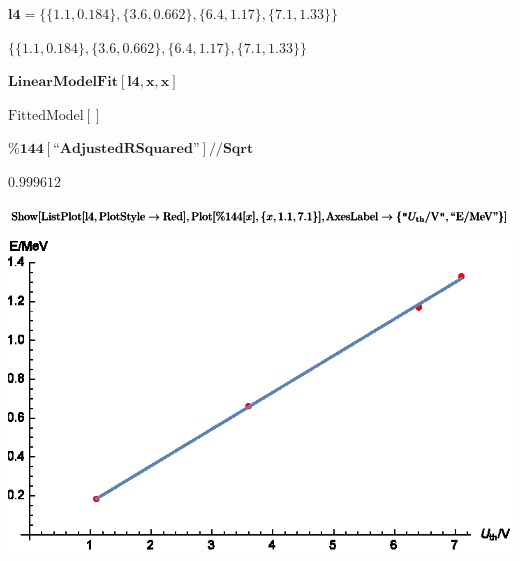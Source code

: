 \documentclass{article}
\begin{document}
\begin{doublespace}
\noindent\(\pmb{\text{l4}=\{\{1.1,0.184\},\{3.6,0.662\},\{6.4,1.17\},\{7.1,1.33\}\}}\)
\end{doublespace}

\begin{doublespace}
\noindent\(\{\{1.1,0.184\},\{3.6,0.662\},\{6.4,1.17\},\{7.1,1.33\}\}\)
\end{doublespace}

\begin{doublespace}
\noindent\(\pmb{\text{LinearModelFit}[\text{l4},x,x]}\)
\end{doublespace}

\begin{doublespace}
\noindent\(\text{FittedModel}[]\)
\end{doublespace}

\begin{doublespace}
\noindent\(\pmb{\text{$\%$144}[\text{{``}AdjustedRSquared{''}}]\text{//}\text{Sqrt}}\)
\end{doublespace}

\begin{doublespace}
\noindent\(0.999612\)
\end{doublespace}

\begin{doublespace}
\noindent\(\pmb{\text{Show}[\text{ListPlot}[\text{l4},\text{PlotStyle}\to \text{Red}],\text{Plot}[\text{$\%$144}[x],\{x,1.1,7.1\}],}\\
\pmb{\left.\text{AxesLabel}\to \left\{\texttt{"}U_{\text{th}}\text{/V$\texttt{"}$},\text{{``}E/MeV{''}}\right\}\right]}\)
\end{doublespace}

\includegraphics{data_gr3.eps}
\end{document}
